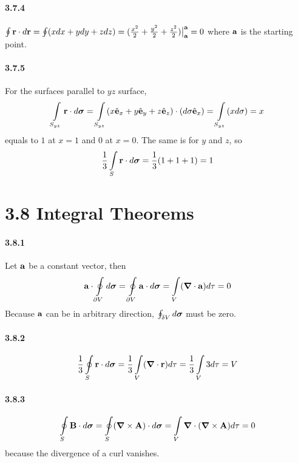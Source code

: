 \documentclass[a4paper]{article}
\begin{document}
\paragraph{3.7.4}
$\oint\mathbf{r}\cdot d\mathbf{r}=\oint(xdx+ydy+zdz)=(\frac{x^2}{2}+\frac{y^2}{2}+\frac{z^2}{2})\big|_{\mathbf{a}}^{\mathbf{a}}=0$ where $\mathbf{a}$ is the starting point.

\paragraph{3.7.5}
For the surfaces parallel to $yz$ surface, \[\int\displaylimits_{S_{yz}}\mathbf{r}\cdot d\boldsymbol{\sigma}=\int\displaylimits_{S_{yz}}(x\hat{\mathbf{e}}_x+y\hat{\mathbf{e}}_y+z\hat{\mathbf{e}}_z)\cdot(d\sigma\hat{\mathbf{e}}_x)=\int\displaylimits_{S_{yz}}(xd\sigma)=x\]
equals to $1$ at $x=1$ and $0$ at $x=0$. The same is for $y$ and $z$, so \[\frac{1}{3}\int\displaylimits_S\mathbf{r}\cdot d\boldsymbol{\sigma}=\frac{1}{3}(1+1+1)=1\]

\section*{3.8 Integral Theorems}

\paragraph{3.8.1}
Let $\mathbf{a}$ be a constant vector, then \[\mathbf{a}\cdot\oint\displaylimits_{\partial V}d\boldsymbol{\sigma}=\oint\displaylimits_{\partial V}\mathbf{a}\cdot d\boldsymbol{\sigma}=\int\displaylimits_V(\boldsymbol{\nabla}\cdot\mathbf{a})d\tau=0\]
Because $\mathbf{a}$ can be in arbitrary direction, $\oint\displaylimits_{\delta V}d\boldsymbol{\sigma}$ must be zero.

\paragraph{3.8.2}
\[
\frac{1}{3}\oint\displaylimits_S \mathbf{r}\cdot d\boldsymbol{\sigma}=\frac{1}{3}\int\displaylimits_V (\boldsymbol{\nabla}\cdot\mathbf{r})d\tau=\frac{1}{3}\int\displaylimits_V 3d\tau=V
\]

\paragraph{3.8.3}
\[
\oint\displaylimits_S\mathbf{B}\cdot d\boldsymbol{\sigma}=\oint\displaylimits_S(\boldsymbol{\nabla}\times\mathbf{A})\cdot d\boldsymbol{\sigma}=\int\displaylimits_V\boldsymbol{\nabla}\cdot(\boldsymbol{\nabla}\times\mathbf{A})d\tau=0
\]
because the divergence of a curl vanishes.
\end{document}
